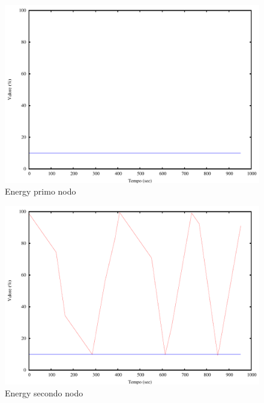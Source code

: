\begin{figure}[H]
\begin{center}
\includegraphics[scale=0.6]{etc/energy1.pdf}
\caption{Energy primo nodo}
\label{fig:energy1}
\end{center}
\end{figure}
\begin{figure}[H]
\begin{center}
\includegraphics[scale=0.6]{etc/energy2.pdf}
\caption{Energy secondo nodo}
\label{fig:energy2}
\end{center}
\end{figure}
